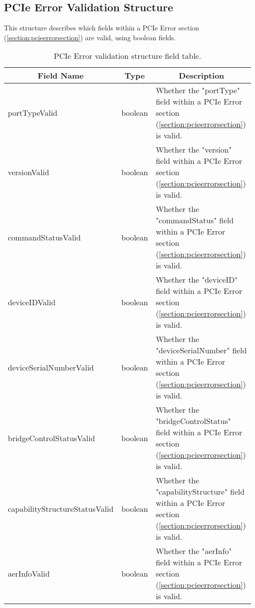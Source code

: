 \documentclass{report}
\newcommand*{\thead}[1]{\multicolumn{1}{|c|}{\bfseries #1}}
\newcommand*{\jsontable}[1]{
    \begin{table}[!ht]
    \label{#1}
    \centering
    \begin{adjustbox}{center}
    \begin{tabular}{|l|c|p{8cm}|}
    \hline
    \thead{Field Name} & \thead{Type} & \thead{Description} \\
    \hline
}
\newcommand*{\jsontableend}[1]{
    \hline
    \end{tabular}
    \end{adjustbox}
    \caption{#1}
    \label{table:#1}
    \end{table}
    \FloatBarrier
}
\begin{document}
\subsection{PCIe Error Validation Structure}
\label{subsection:pcieerrorvalidationstructure}
This structure describes which fields within a PCIe Error section (\ref{section:pcieerrorsection}) are valid, using boolean fields.
\jsontable{table:pcieerrorvalidationstructure}
portTypeValid & boolean & Whether the "portType" field within a PCIe Error section (\ref{section:pcieerrorsection}) is valid.\\
\hline
versionValid & boolean & Whether the "version" field within a PCIe Error section (\ref{section:pcieerrorsection}) is valid.\\
\hline
commandStatusValid & boolean & Whether the "commandStatus" field within a PCIe Error section (\ref{section:pcieerrorsection}) is valid.\\
\hline
deviceIDValid & boolean & Whether the "deviceID" field within a PCIe Error section (\ref{section:pcieerrorsection}) is valid.\\
\hline
deviceSerialNumberValid & boolean & Whether the "deviceSerialNumber" field within a PCIe Error section (\ref{section:pcieerrorsection}) is valid.\\
\hline
bridgeControlStatusValid & boolean & Whether the "bridgeControlStatus" field within a PCIe Error section (\ref{section:pcieerrorsection}) is valid.\\
\hline
capabilityStructureStatusValid & boolean & Whether the "capabilityStructure" field within a PCIe Error section (\ref{section:pcieerrorsection}) is valid.\\
\hline
aerInfoValid & boolean & Whether the "aerInfo" field within a PCIe Error section (\ref{section:pcieerrorsection}) is valid.\\
\hline
\jsontableend{PCIe Error validation structure field table.}

\end{document}
